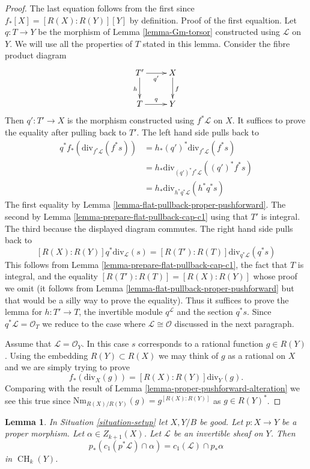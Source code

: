 \documentclass{stacks-project}
\theoremstyle{plain}
\newtheorem{lemma}[subsection]{Lemma}
\theoremstyle{definition}
\theoremstyle{remark}
\numberwithin{equation}{subsection}
\def\CH{\mathop{\mathrm{CH}}\nolimits}
\begin{document}
\begin{proof}
The last equation follows from the first since $f_*[X] = [R(X) : R(Y)][Y]$ by
definition. Proof of the first equaltion. Let $q : T \to Y$ be the morphism of
Lemma \ref{lemma-Gm-torsor} constructed using $\mathcal{L}$ on $Y$. We will use
all the properties of $T$ stated in this lemma. Consider the fibre product
diagram
$$
\xymatrix{
T' \ar[r]_{q'} \ar[d]_h & X \ar[d]^f \\
T \ar[r]^q & Y
}
$$
Then $q' : T' \to X$ is the morphism constructed using $f^*\mathcal{L}$
on $X$. It suffices to prove the equality after pulling back to $T'$.
The left hand side pulls back to
\begin{align*}
q^*f_*\left(\text{div}_{f^*\mathcal{L}}(f^*s)\right)
& =
h_*(q')^*\text{div}_{f^*\mathcal{L}}(f^*s) \\
& =
h_*\text{div}_{(q')^*f^*\mathcal{L}}((q')^*f^*s) \\
& =
h_*\text{div}_{h^*q^*\mathcal{L}}(h^*q^*s)
\end{align*}
The first equality by Lemma \ref{lemma-flat-pullback-proper-pushforward}.
The second by Lemma \ref{lemma-prepare-flat-pullback-cap-c1}
using that $T'$ is integral. The third because the displayed diagram commutes.
The right hand side pulls back to
$$
[R(X) : R(Y)]q^*\text{div}_\mathcal{L}(s) =
[R(T') : R(T)]\text{div}_{q^*\mathcal{L}}(q^*s)
$$
This follows from Lemma \ref{lemma-prepare-flat-pullback-cap-c1},
the fact that $T$ is integral, and the equality
$[R(T') : R(T)] = [R(X) : R(Y)]$ whose proof we omit
(it follows from Lemma \ref{lemma-flat-pullback-proper-pushforward}
but that would be a silly way to prove the equality).
Thus it suffices to prove the lemma for $h : T' \to T$, the
invertible module $q^\mathcal{L}$ and the section $q^*s$.
Since $q^*\mathcal{L} = \mathcal{O}_T$
we reduce to the case where $\mathcal{L} \cong \mathcal{O}$
discussed in the next paragraph.

\medskip\noindent
Assume that $\mathcal{L} = \mathcal{O}_Y$. In this case $s$
corresponds to a rational function $g \in R(Y)$. Using the
embedding $R(Y) \subset R(X)$ we may think of $g$ as a rational
on $X$ and we are simply trying to prove
$$
f_*\left(\text{div}_X(g)\right) = [R(X) : R(Y)]\text{div}_Y(g).
$$
Comparing with the result of Lemma \ref{lemma-proper-pushforward-alteration}
we see this true since $\text{Nm}_{R(X)/R(Y)}(g) = g^{[R(X) : R(Y)]}$
as $g \in R(Y)^*$.
\end{proof}

\begin{lemma}
\label{lemma-pushforward-cap-c1}
In Situation \ref{situation-setup} let $X, Y/B$ be good.
Let $p : X \to Y$ be a proper morphism.
Let $\alpha \in Z_{k + 1}(X)$.
Let $\mathcal{L}$ be an invertible sheaf on $Y$.
Then
$$
p_*(c_1(p^*\mathcal{L}) \cap \alpha) = c_1(\mathcal{L}) \cap p_*\alpha
$$
in $\CH_k(Y)$.
\end{lemma}
\end{document}
